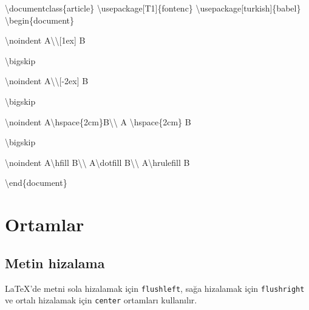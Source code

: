 \documentclass[
  letterpaper,
  DIV=11,
  numbers=noendperiod]{scrreprt}
\newenvironment{Shaded}{\begin{snugshade}}{\end{snugshade}}
\newcommand{\BuiltInTok}[1]{\textcolor[rgb]{0.00,0.23,0.31}{#1}}
\newcommand{\ExtensionTok}[1]{\textcolor[rgb]{0.00,0.23,0.31}{#1}}
\newcommand{\FunctionTok}[1]{\textcolor[rgb]{0.28,0.35,0.67}{#1}}
\newcommand{\KeywordTok}[1]{\textcolor[rgb]{0.00,0.23,0.31}{#1}}
\newcommand{\NormalTok}[1]{\textcolor[rgb]{0.00,0.23,0.31}{#1}}
\begin{document}
\begin{Shaded}
\begin{Highlighting}[]
\BuiltInTok{\textbackslash{}documentclass}\NormalTok{\{}\ExtensionTok{article}\NormalTok{\}}
\BuiltInTok{\textbackslash{}usepackage}\NormalTok{[T1]\{}\ExtensionTok{fontenc}\NormalTok{\}}
\BuiltInTok{\textbackslash{}usepackage}\NormalTok{[turkish]\{}\ExtensionTok{babel}\NormalTok{\}}
\KeywordTok{\textbackslash{}begin}\NormalTok{\{}\ExtensionTok{document}\NormalTok{\}}

\FunctionTok{\textbackslash{}noindent} 
\NormalTok{A}\FunctionTok{\textbackslash{}\textbackslash{}}\NormalTok{[1ex]}
\NormalTok{B}

\FunctionTok{\textbackslash{}bigskip}

\FunctionTok{\textbackslash{}noindent} 
\NormalTok{A}\FunctionTok{\textbackslash{}\textbackslash{}}\NormalTok{[{-}2ex]}
\NormalTok{B}

\FunctionTok{\textbackslash{}bigskip}

\FunctionTok{\textbackslash{}noindent} 
\NormalTok{A}\FunctionTok{\textbackslash{}hspace}\NormalTok{\{2cm\}B}\FunctionTok{\textbackslash{}\textbackslash{}}
\NormalTok{A }\FunctionTok{\textbackslash{}hspace}\NormalTok{\{2cm\} B}

\FunctionTok{\textbackslash{}bigskip}

\FunctionTok{\textbackslash{}noindent} 
\NormalTok{A}\FunctionTok{\textbackslash{}hfill}\NormalTok{ B}\FunctionTok{\textbackslash{}\textbackslash{}}
\NormalTok{A}\FunctionTok{\textbackslash{}dotfill}\NormalTok{ B}\FunctionTok{\textbackslash{}\textbackslash{}}
\NormalTok{A}\FunctionTok{\textbackslash{}hrulefill}\NormalTok{ B}

\KeywordTok{\textbackslash{}end}\NormalTok{\{}\ExtensionTok{document}\NormalTok{\}}
\end{Highlighting}
\end{Shaded}

\hypertarget{ortamlar-1}{%
\section{Ortamlar}\label{ortamlar-1}}

\hypertarget{metin-hizalama}{%
\subsection{Metin hizalama}\label{metin-hizalama}}

{\LaTeX}'de metni sola hizalamak için \texttt{flushleft}, sağa hizalamak
için \texttt{flushright} ve ortalı hizalamak için \texttt{center}
ortamları kullanılır.
\end{document}

